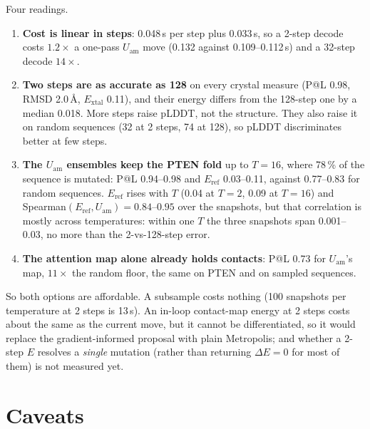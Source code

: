 \documentclass[11pt,a4paper]{article}
\newcommand{\Uam}{U_{\mathrm{am}}}
\begin{document}
\noindent
Four readings.
\begin{enumerate}
\item \textbf{Cost is linear in steps}: 0.048\,s per step plus 0.033\,s, so a
      2-step decode costs $1.2\times$ a one-pass $\Uam$ move (0.132 against
      0.109--0.112\,s) and a 32-step decode $14\times$.
\item \textbf{Two steps are as accurate as 128} on every crystal measure
      (P@L 0.98, RMSD 2.0\,\AA, $E_{\mathrm{xtal}}$ 0.11), and their energy
      differs from the 128-step one by a median 0.018. More steps raise
      pLDDT, not the structure. They also raise it on random sequences
      (32 at 2 steps, 74 at 128), so pLDDT discriminates better at few steps.
\item \textbf{The $\Uam$ ensembles keep the PTEN fold} up to $T=16$, where 78\,\%
      of the sequence is mutated: P@L 0.94--0.98 and $E_{\mathrm{ref}}$
      0.03--0.11, against 0.77--0.83 for random sequences.
      $E_{\mathrm{ref}}$ rises with $T$ (0.04 at $T=2$, 0.09 at $T=16$) and
      Spearman$(E_{\mathrm{ref}},\Uam) = 0.84$--$0.95$ over the snapshots, but
      that correlation is mostly across temperatures: within one $T$ the three
      snapshots span 0.001--0.03, no more than the 2-vs-128-step error.
\item \textbf{The attention map alone already holds contacts}: P@L 0.73 for
      $\Uam$'s map, $11\times$ the random floor, the same on PTEN and on
      sampled sequences.
\end{enumerate}
\noindent
So both options are affordable. A subsample costs nothing (100 snapshots per
temperature at 2 steps is 13\,s). An in-loop contact-map energy at 2 steps
costs about the same as the current move, but it cannot be differentiated, so
it would replace the gradient-informed proposal with plain Metropolis; and
whether a 2-step $E$ resolves a \emph{single} mutation (rather than returning
$\Delta E = 0$ for most of them) is not measured yet.

\section{Caveats}
\end{document}
